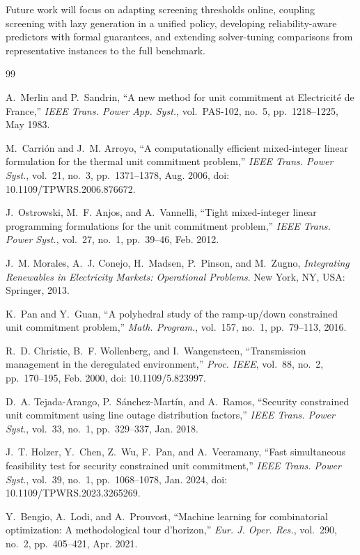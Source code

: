 \documentclass[runningheads]{llncs}
\begin{document}
Future work will focus on adapting screening thresholds online, coupling screening with lazy generation in a unified policy, developing reliability-aware predictors with formal guarantees, and extending solver-tuning comparisons from representative instances to the full benchmark.


\begin{thebibliography}{99}

A.~Merlin and P.~Sandrin, ``A new method for unit commitment at Electricit\'e de France,'' \emph{IEEE Trans. Power App. Syst.}, vol.~PAS-102, no.~5, pp.~1218--1225, May 1983.

 M.~Carri\'on and J.~M. Arroyo, ``A computationally efficient mixed-integer linear formulation for the thermal unit commitment problem,'' \emph{IEEE Trans. Power Syst.}, vol.~21, no.~3, pp.~1371--1378, Aug. 2006, doi: 10.1109/TPWRS.2006.876672.

J.~Ostrowski, M.~F. Anjos, and A.~Vannelli, ``Tight mixed-integer linear programming formulations for the unit commitment problem,'' \emph{IEEE Trans. Power Syst.}, vol.~27, no.~1, pp.~39--46, Feb. 2012.

 J.~M. Morales, A.~J. Conejo, H.~Madsen, P.~Pinson, and M.~Zugno, \emph{Integrating Renewables in Electricity Markets: Operational Problems}. New York, NY, USA: Springer, 2013.

 K.~Pan and Y.~Guan, ``A polyhedral study of the ramp-up/down constrained unit commitment problem,'' \emph{Math. Program.}, vol.~157, no.~1, pp.~79--113, 2016.

R.~D. Christie, B.~F. Wollenberg, and I.~Wangensteen, ``Transmission management in the deregulated environment,'' \emph{Proc. IEEE}, vol.~88, no.~2, pp.~170--195, Feb. 2000, doi: 10.1109/5.823997.

 D.~A. Tejada-Arango, P.~S\'anchez-Mart\'in, and A.~Ramos, ``Security constrained unit commitment using line outage distribution factors,'' \emph{IEEE Trans. Power Syst.}, vol.~33, no.~1, pp.~329--337, Jan. 2018.

 J.~T. Holzer, Y.~Chen, Z.~Wu, F.~Pan, and A.~Veeramany, ``Fast simultaneous feasibility test for security constrained unit commitment,'' \emph{IEEE Trans. Power Syst.}, vol.~39, no.~1, pp.~1068--1078, Jan. 2024, doi: 10.1109/TPWRS.2023.3265269.


Y.~Bengio, A.~Lodi, and A.~Prouvost, ``Machine learning for combinatorial optimization: A methodological tour d'horizon,'' \emph{Eur. J. Oper. Res.}, vol.~290, no.~2, pp.~405--421, Apr. 2021.


\end{thebibliography}
\end{document}
